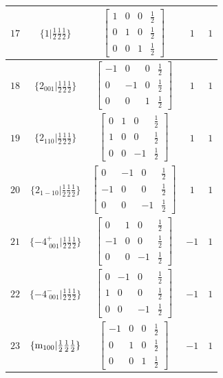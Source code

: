 \documentclass[fleqn,8pt]{jsarticle}
\begin{document}
\begin{longtable}{ccccc}
$ 17 $ & $ \{1|\frac{1}{2} \frac{1}{2} \frac{1}{2}\} $ & $ \begin{bmatrix} 1 & 0 & 0 & \frac{1}{2} \\ 0 & 1 & 0 & \frac{1}{2} \\ 0 & 0 & 1 & \frac{1}{2} \end{bmatrix} $ & $ 1 $ & $ 1 $ \\ \hline
$ 18 $ & $ \{2{}_{001}|\frac{1}{2} \frac{1}{2} \frac{1}{2}\} $ & $ \begin{bmatrix} -1 & 0 & 0 & \frac{1}{2} \\ 0 & -1 & 0 & \frac{1}{2} \\ 0 & 0 & 1 & \frac{1}{2} \end{bmatrix} $ & $ 1 $ & $ 1 $ \\ \hline
$ 19 $ & $ \{2{}_{110}|\frac{1}{2} \frac{1}{2} \frac{1}{2}\} $ & $ \begin{bmatrix} 0 & 1 & 0 & \frac{1}{2} \\ 1 & 0 & 0 & \frac{1}{2} \\ 0 & 0 & -1 & \frac{1}{2} \end{bmatrix} $ & $ 1 $ & $ 1 $ \\ \hline
$ 20 $ & $ \{2{}_{1-10}|\frac{1}{2} \frac{1}{2} \frac{1}{2}\} $ & $ \begin{bmatrix} 0 & -1 & 0 & \frac{1}{2} \\ -1 & 0 & 0 & \frac{1}{2} \\ 0 & 0 & -1 & \frac{1}{2} \end{bmatrix} $ & $ 1 $ & $ 1 $ \\ \hline
$ 21 $ & $ \{-4^{+}_{\,\,001}|\frac{1}{2} \frac{1}{2} \frac{1}{2}\} $ & $ \begin{bmatrix} 0 & 1 & 0 & \frac{1}{2} \\ -1 & 0 & 0 & \frac{1}{2} \\ 0 & 0 & -1 & \frac{1}{2} \end{bmatrix} $ & $ -1 $ & $ 1 $ \\ \hline
$ 22 $ & $ \{-4^{-}_{\,\,001}|\frac{1}{2} \frac{1}{2} \frac{1}{2}\} $ & $ \begin{bmatrix} 0 & -1 & 0 & \frac{1}{2} \\ 1 & 0 & 0 & \frac{1}{2} \\ 0 & 0 & -1 & \frac{1}{2} \end{bmatrix} $ & $ -1 $ & $ 1 $ \\ \hline
$ 23 $ & $ \{{\rm m}_{100}|\frac{1}{2} \frac{1}{2} \frac{1}{2}\} $ & $ \begin{bmatrix} -1 & 0 & 0 & \frac{1}{2} \\ 0 & 1 & 0 & \frac{1}{2} \\ 0 & 0 & 1 & \frac{1}{2} \end{bmatrix} $ & $ -1 $ & $ 1 $ \\ \hline

\end{longtable}
\end{document}
